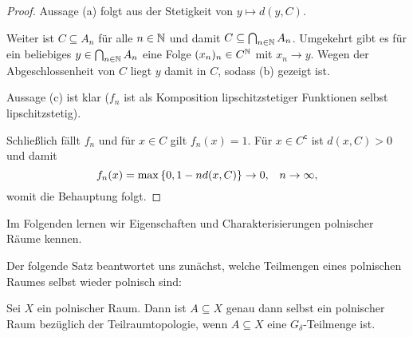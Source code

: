 \documentclass[../main/main.tex]{subfiles}
\begin{document}
	\begin{proof}
		Aussage (a) folgt aus der Stetigkeit von $y \mapsto d(y, C)$.
		
		Weiter ist $C \subseteq A_n$ für alle $n \in \mathbb{N}$ und damit 
		$C \subseteq \bigcap_{n \in \mathbb{N}} A_n$. 
		Umgekehrt gibt es für ein beliebiges $y \in \bigcap_{n \in \mathbb{N}} A_n$
		eine Folge $(x_n)_n \in C^{\mathbb{N}}$ mit $x_n \rightarrow y$. 
		Wegen der Abgeschlossenheit von $C$ liegt $y$ damit in $C$, sodass (b) gezeigt ist.
		
		Aussage (c) ist klar ($f_n$ ist als Komposition 
		lipschitzstetiger Funktionen selbst lipschitzstetig).
		
		Schließlich fällt $f_n$ und für $x \in C$ gilt $f_n(x) = 1$. 
		Für $x \in C^\mathsf{c}$ ist $d(x, C) > 0$ und damit
		$$f_n(x) = \max \left\{0, 1-n d(x, C)\right\} 
		\to 0 \text{,} \quad n \to \infty \text{,}$$
		womit die Behauptung folgt.
	\end{proof}

	Im Folgenden lernen wir Eigenschaften und Charakterisierungen polnischer Räume kennen.
	
	Der folgende Satz beantwortet uns zunächst, welche Teilmengen eines polnischen Raumes selbst wieder polnisch sind:

	\begin{Satz}
		\label{thm:gdeltasubsetsofpolishspaces}
		Sei $X$ ein polnischer Raum. Dann ist $A \subseteq X$ genau dann selbst ein polnischer Raum bezüglich der Teilraumtopologie, 
		wenn $A \subseteq X$ eine $G_\delta$-Teilmenge ist.
	\end{Satz}
\end{document}
